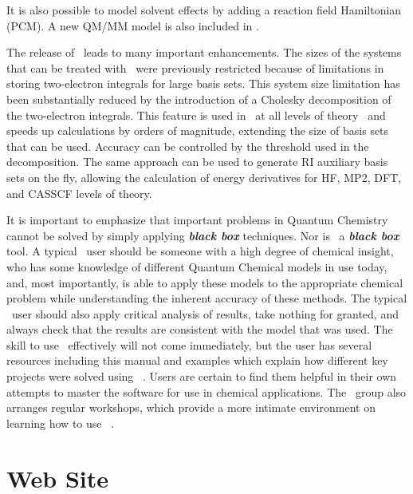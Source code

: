 It is also possible to model solvent effects by adding a 
reaction field Hamiltonian (PCM).  A new QM/MM model is also included in \molcas. 

The release of \molcasvii\ leads to many important enhancements. The sizes of the systems 
that can be treated with \molcas\ were previously restricted because of limitations in 
storing two-electron integrals for large basis sets. This system size limitation has 
been substantially reduced by the introduction of a Cholesky decomposition of the 
two-electron integrals.  This feature is used in \molcasvii\ at all levels 
of theory~\cite{Aquilante:07b,Aquilante:08a,Aquilante:08b} and speeds up calculations 
by orders of magnitude, extending the size of basis sets that can be used. 
Accuracy can be controlled by the threshold used in the decomposition. The same
approach can be used to generate RI auxiliary basis sets on the fly, 
allowing the calculation of energy derivatives for HF, MP2, DFT, and CASSCF levels of theory.

It is important to emphasize that important problems in Quantum Chemistry cannot be solved 
by simply applying \textbf{\textit{black box}} techniques.
Nor is \molcas\ a \textbf{\textit{black box}} tool.  A typical \molcas\ user should be 
someone with a high degree of chemical insight, who has some knowledge of different 
Quantum Chemical models in use today, and, most importantly, is able to apply these 
models to the appropriate chemical problem while understanding the inherent accuracy 
of these methods.
The typical \molcas\ user should also apply critical analysis of results, take nothing 
for granted, and always check that the results are consistent with the model that was used.
The skill to use \molcas\ effectively will not come immediately, but 
the user has several resources including this manual and examples which 
explain how different key projects were solved using \molcas\ . 
Users are certain to find them helpful in their own attempts to master the software 
for use in chemical applications. The \molcas\ group also arranges regular workshops, 
which provide a more intimate environment on learning  how to use \molcas\ .


\ifmanual


\fi



\section{Web Site}

